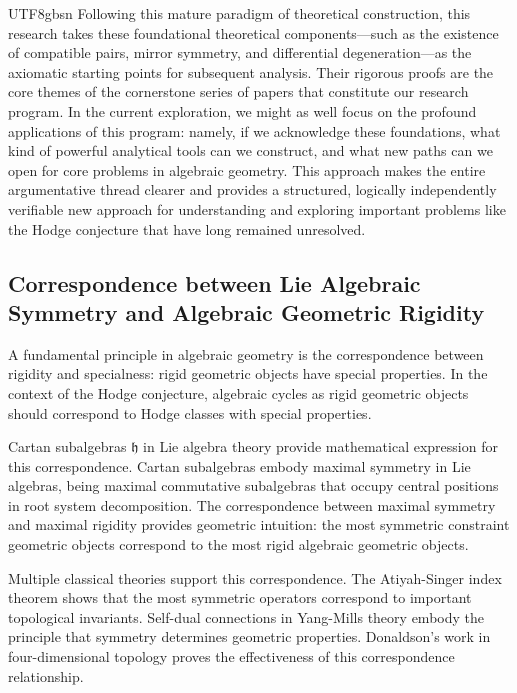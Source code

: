 \documentclass[a4paper,12pt]{extarticle}
\theoremstyle{definition}
\begin{document}
\begin{CJK}{UTF8}{gbsn}
Following this mature paradigm of theoretical construction, this research takes these foundational theoretical components—such as the existence of compatible pairs, mirror symmetry, and differential degeneration—as the axiomatic starting points for subsequent analysis. Their rigorous proofs are the core themes of the cornerstone series of papers that constitute our research program. In the current exploration, we might as well focus on the profound applications of this program: namely, if we acknowledge these foundations, what kind of powerful analytical tools can we construct, and what new paths can we open for core problems in algebraic geometry. This approach makes the entire argumentative thread clearer and provides a structured, logically independently verifiable new approach for understanding and exploring important problems like the Hodge conjecture that have long remained unresolved.

\subsection{Correspondence between Lie Algebraic Symmetry and Algebraic Geometric Rigidity}
\label{subsec:lie_algebra_algebraic_correspondence}

A fundamental principle in algebraic geometry is the correspondence between rigidity and specialness: rigid geometric objects have special properties. In the context of the Hodge conjecture, algebraic cycles as rigid geometric objects should correspond to Hodge classes with special properties.

Cartan subalgebras $\mathfrak{h}$ in Lie algebra theory provide mathematical expression for this correspondence\cite{humphreys1972introduction}. Cartan subalgebras embody maximal symmetry in Lie algebras, being maximal commutative subalgebras that occupy central positions in root system decomposition. The correspondence between maximal symmetry and maximal rigidity provides geometric intuition: the most symmetric constraint geometric objects correspond to the most rigid algebraic geometric objects.

Multiple classical theories support this correspondence. The Atiyah-Singer index theorem\cite{atiyah1963index} shows that the most symmetric operators correspond to important topological invariants. Self-dual connections in Yang-Mills theory\cite{atiyah1983yang} embody the principle that symmetry determines geometric properties. Donaldson's work in four-dimensional topology\cite{donaldson1983instantons} proves the effectiveness of this correspondence relationship.


\end{CJK}
\end{document}
